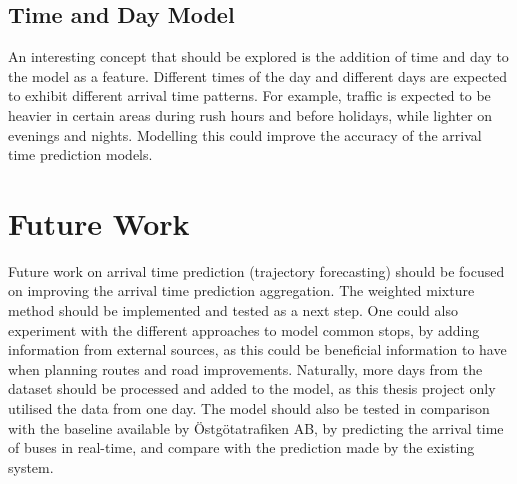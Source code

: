 \subsection{Time and Day Model}
An interesting concept that should be explored is the addition of time and day to the model as a feature.
Different times of the day and different days are expected to exhibit different arrival time patterns.
For example, traffic is expected to be heavier in certain areas during rush hours and before holidays, while lighter on evenings and nights. 
Modelling this could improve the accuracy of the arrival time prediction models. 

\section{Future Work}
Future work on arrival time prediction (trajectory forecasting) should be focused on improving the arrival time prediction aggregation.
The weighted mixture method should be implemented and tested as a next step.
One could also experiment with the different approaches to model common stops, by adding information from external sources, as this could be beneficial information to have when planning routes and road improvements.
Naturally, more days from the dataset should be processed and added to the model, as this thesis project only utilised the data from one day.
The model should also be tested in comparison with the baseline available by Östgötatrafiken AB, by predicting the arrival time of buses in real-time, and compare with the prediction made by the existing system.

